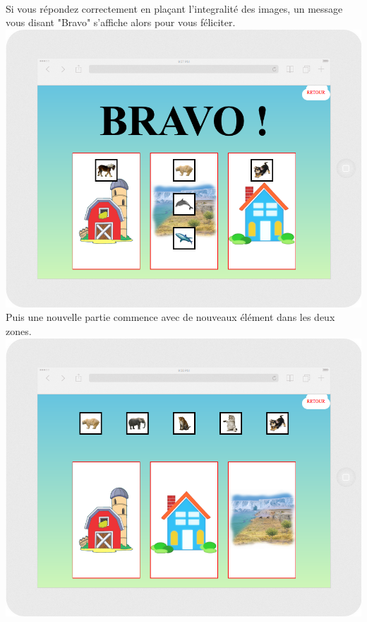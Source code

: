 \documentclass{article}
\begin{document}
\vspace{0.5cm}\\
Si vous répondez correctement en pla\c{c}ant l'integralité des images, un message vous disant "Bravo" s'affiche alors pour vous féliciter.
\vspace{0.5cm}\\
\includegraphics[width=1.0\textwidth]{zone6}
\vspace{0.5cm}\\
Puis une nouvelle partie commence avec de nouveaux élément dans les deux zones.
\vspace{0.5cm}\\
\includegraphics[width=1.0\textwidth]{zone7}
\vspace{0.5cm}\\
\end{document}
